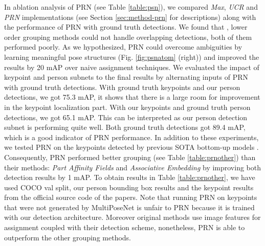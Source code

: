 \documentclass[runningheads]{llncs}
\begin{document}
\begin{table}
\begin{center}
\caption{PRN assignment results with non-grouped keypoints obtained from two bottom-up methods.}
\label{table:prnother}
\end{center}
\end{table}


In ablation analysis of PRN (see Table \ref{table:psn}), we compared \textit{Max}, \textit{UCR} and \textit{PRN} implementations (see Section \ref{sec:method-prn} for descriptions) along with the performance of PRN with ground truth detections. We found that , lower order grouping methods could not  handle overlapping detections, both of them performed poorly. As we hypothesized, PRN could overcome ambiguities by learning meaningful pose structures (Fig. \ref{fig:psnatom} (right)) and improved the results by 20 mAP over naive assignment techniques. We evaluated the impact of keypoint and person subnets to the final results by alternating inputs of PRN with ground truth detections. With ground truth keypoints and our person detections, we got 75.3 mAP,  it shows that there is a large room for improvement in the keypoint localization part. With our keypoints and ground truth person detections, we got 65.1 mAP. This can be interpreted as our person detection subnet is performing quite well. Both ground truth detections got 89.4 mAP, which is a good indicator of PRN performance. In addition to these experiments, we tested PRN on the keypoints detected by previous SOTA bottom-up models \cite{Cao2016,Newell2016b}. Consequently, PRN performed better grouping (see Table \ref{table:prnother}) than their methods: \textit{Part Affinity Fields}\cite{Cao2016} and \textit{Associative Embedding}\cite{Newell2016b} by improving both detection results by 1 mAP. To obtain results in Table \ref{table:prnother}, we have used COCO val split, our person bounding box results and the keypoint results from the official source code of the papers.     Note that running PRN on keypoints that were not generated by MultiPoseNet is unfair to PRN because it is trained with our detection architecture. Moreover original methods use image features for assignment coupled with their detection scheme, nonetheless, PRN is able to outperform the other grouping methods.    
\end{document}
